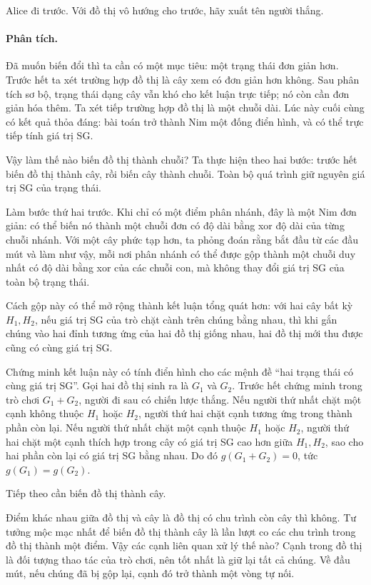 \documentclass[11pt]{article}
\begin{document}
Alice đi trước. Với đồ thị vô hướng cho trước, hãy xuất tên người thắng.

\paragraph{Phân tích.}
Đã muốn biến đổi thì ta cần có một mục tiêu: một trạng thái đơn giản hơn. Trước
hết ta xét trường hợp đồ thị là cây xem có đơn giản hơn không. Sau phân tích
sơ bộ, trạng thái dạng cây vẫn khó cho kết luận trực tiếp; nó còn cần đơn giản
hóa thêm. Ta xét tiếp trường hợp đồ thị là một chuỗi dài. Lúc này cuối cùng có
kết quả thỏa đáng: bài toán trở thành Nim một đống điển hình, và có thể trực
tiếp tính giá trị SG.

Vậy làm thế nào biến đồ thị thành chuỗi? Ta thực hiện theo hai bước: trước hết
biến đồ thị thành cây, rồi biến cây thành chuỗi. Toàn bộ quá trình giữ nguyên
giá trị SG của trạng thái.

Làm bước thứ hai trước. Khi chỉ có một điểm phân nhánh, đây là một Nim đơn
giản: có thể biến nó thành một chuỗi đơn có độ dài bằng xor độ dài của từng
chuỗi nhánh. Với một cây phức tạp hơn, ta phỏng đoán rằng bắt đầu từ các đầu
mút và làm như vậy, mỗi nơi phân nhánh có thể được gộp thành một chuỗi duy
nhất có độ dài bằng xor của các chuỗi con, mà không thay đổi giá trị SG của
toàn bộ trạng thái.

Cách gộp này có thể mở rộng thành kết luận tổng quát hơn: với hai cây bất kỳ
\(H_1,H_2\), nếu giá trị SG của trò chặt cành trên chúng bằng nhau, thì khi gắn
chúng vào hai đỉnh tương ứng của hai đồ thị giống nhau, hai đồ thị mới thu
được cũng có cùng giá trị SG.

Chứng minh kết luận này có tính điển hình cho các mệnh đề ``hai trạng thái có
cùng giá trị SG''. Gọi hai đồ thị sinh ra là \(G_1\) và \(G_2\). Trước hết
chứng minh trong trò chơi \(G_1+G_2\), người đi sau có chiến lược thắng. Nếu
người thứ nhất chặt một cạnh không thuộc \(H_1\) hoặc \(H_2\), người thứ hai
chặt cạnh tương ứng trong thành phần còn lại. Nếu người thứ nhất chặt một cạnh
thuộc \(H_1\) hoặc \(H_2\), người thứ hai chặt một cạnh thích hợp trong cây có
giá trị SG cao hơn giữa \(H_1,H_2\), sao cho hai phần còn lại có giá trị SG
bằng nhau. Do đó \(g(G_1+G_2)=0\), tức \(g(G_1)=g(G_2)\).

Tiếp theo cần biến đồ thị thành cây.

Điểm khác nhau giữa đồ thị và cây là đồ thị có chu trình còn cây thì không.
Tư tưởng mộc mạc nhất để biến đồ thị thành cây là lần lượt co các chu trình
trong đồ thị thành một điểm. Vậy các cạnh liên quan xử lý thế nào? Cạnh trong
đồ thị là đối tượng thao tác của trò chơi, nên tốt nhất là giữ lại tất cả
chúng. Về đầu mút, nếu chúng đã bị gộp lại, cạnh đó trở thành một vòng tự nối.
\end{document}

